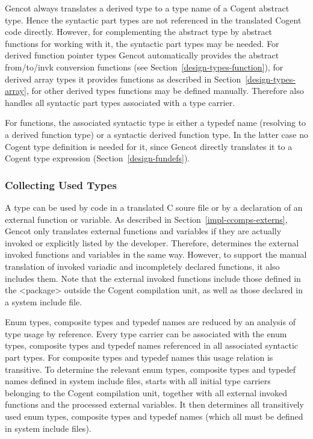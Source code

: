 Gencot always translates a derived type to a type name of a Cogent abstract type. Hence the syntactic part types are 
not referenced in the translated Cogent code directly. However, for complementing the abstract type by abstract
functions for working with it, the syntactic part types may be needed. For derived function pointer types Gencot automatically
provides the abstract from/to/invk conversion functions (see Section~\ref{design-types-function}), for derived array
types it provides functions as described in Section~\ref{design-types-array}, for other derived 
types functions may be defined manually. Therefore  also handles all syntactic
part types associated with a type carrier.

For functions, the associated syntactic type is either a typedef name (resolving to a derived function type) 
or a syntactic derived function type. In the latter case no Cogent type definition is needed for it, since Gencot
directly translates it to a Cogent type expression (Section~\ref{design-fundefs}). 

\subsubsection{Collecting Used Types}

A type can be used by code in a translated C soure file or by a declaration of an external function or variable.
As described in Section~\ref{impl-ccomps-externs}, Gencot only translates external functions and variables if they are 
actually invoked or explicitly listed by the developer.
Therefore,  determines the external invoked functions and variables in the same way. However, to support
the manual translation of invoked variadic and incompletely declared functions, it also includes them. Note that
the external invoked functions include those defined in the <package> outside the Cogent compilation unit, as well
as those declared in a system include file.

Enum types, composite types and typedef names are reduced by an analysis of type usage by reference. Every type carrier can be
associated with the enum types, composite types and typedef names referenced in all associated syntactic part types. For 
composite types and typedef names this usage relation is transitive. To determine the relevant enum types, composite types 
and typedef names defined in system include files,  starts with all initial type carriers belonging
to the Cogent compilation unit, together with all external invoked functions and the processed external variables. 
It then determines all transitively
used enum types, composite types and typedef names (which all must be defined in system include files).

